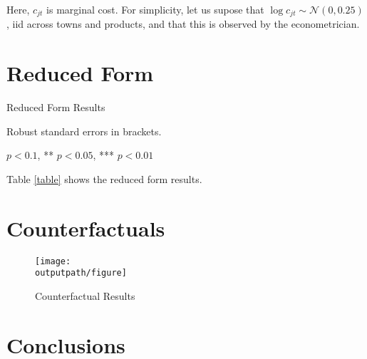 \documentclass[11pt]{article}
\begin{document}
Here, $c_{jt}$ is marginal cost. For simplicity, let us supose that $\log c_{jt} \sim \mathcal{N}(0,0.25)$, iid across towns and products, and that this is observed by the econometrician.

\section{Reduced Form}
\lipsum[11-13]

\begin{table}[h]
    \centering
    \begin{threeparttable}
    \caption{Reduced Form Results \label{table}} 
    \vspace{1em}
    
    \begin{tablenotes}
    \footnotesize \item Robust standard errors in brackets. 
    \item * $p < 0.1$, ** $p < 0.05$, *** $p < 0.01$
    \end{tablenotes}
    \end{threeparttable}  
\end{table}

Table \ref{table} shows the reduced form results.

\lipsum[14-16]

\section{Counterfactuals}
\lipsum[17-20]

\begin{figure}[h]
    \centering
    \caption{Counterfactual Results}
    \label{figure}
    \texttt{[image: \\outputpath/figure]}
\end{figure}

\lipsum[21-30]

\section{Conclusions}
\lipsum[31-32]
\end{document}
